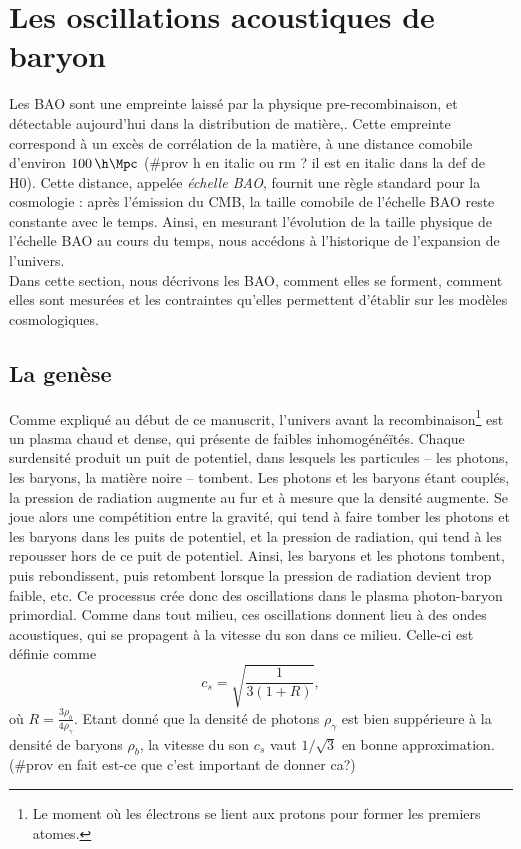 \documentclass[11pt, twoside, a4paper, openright]{report}
\begin{document}
\section{Les oscillations acoustiques de baryon}
Les BAO sont une empreinte laissé par la physique pre-recombinaison, et détectable aujourd'hui dans la distribution de matière,. Cette empreinte correspond à un excès de corrélation de la matière, à une distance comobile d'environ $\SI{100}{\per\h\Mpc}$ (\#prov h en italic ou rm ? il est en italic dans la def de H0). Cette distance, appelée \emph{échelle BAO}, fournit une règle standard pour la cosmologie : après l'émission du CMB, la taille comobile de l'échelle BAO reste constante avec le temps. Ainsi, en mesurant l'évolution de la taille physique de l'échelle BAO au cours du temps, nous accédons à l'historique de l'expansion de l'univers. \\
Dans cette section, nous décrivons les BAO, comment elles se forment, comment elles sont mesurées et les contraintes qu'elles permettent d'établir sur les modèles cosmologiques.

\subsection{La genèse}
Comme expliqué au début de ce manuscrit, l'univers avant la recombinaison\footnote{Le moment où les électrons se lient aux protons pour former les premiers atomes.} est un plasma chaud et dense,
qui présente de faibles inhomogénéïtés.
Chaque surdensité produit un puit de potentiel,
dans lesquels les particules – les photons, les baryons, la matière noire – tombent.
Les photons et les baryons étant couplés, la pression de radiation augmente au fur et à mesure que la densité augmente. Se joue alors une compétition entre la gravité, qui tend à faire tomber les photons et les baryons dans les puits de potentiel, et la pression de radiation, qui tend à les repousser hors de ce puit de potentiel. Ainsi, les baryons et les photons tombent, puis rebondissent, puis retombent lorsque la pression de radiation devient trop faible, etc.
Ce processus crée donc des oscillations dans le plasma photon-baryon primordial. Comme dans tout milieu, ces oscillations donnent lieu à des ondes acoustiques, qui se propagent à la vitesse du son dans ce milieu. Celle-ci est définie comme
\begin{equation}
  \label{eq:sound_speed}
  c_{s} = \sqrt{\frac{1}{3(1 + R)}},
\end{equation}
où $R = \frac{3\rho_b}{4\rho_{\gamma}}$. Etant donné que la densité de photons $\rho_{\gamma}$ est bien suppérieure à la densité de baryons $\rho_{b}$, la vitesse du son $c_s$ vaut $1/\sqrt{3}$ en bonne approximation. (\#prov en fait est-ce que c'est important de donner ca?)
\end{document}
